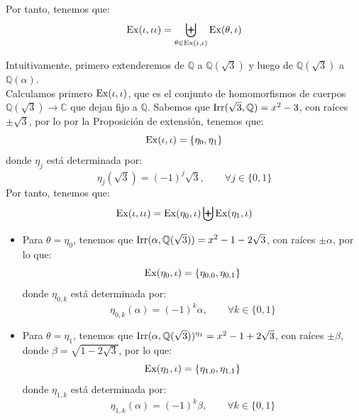 \begin{ejercicio}
\begin{enumerate}
            Por tanto, tenemos que:
            \begin{equation*}
                \operatorname{Ex}(\iota,\iota\iota) = \biguplus_{\theta\in \operatorname{Ex}(\iota,\iota)} \operatorname{Ex}(\theta,\iota)
            \end{equation*}

            Intuitivamente, primero extenderemos de $\mathbb{Q}$ a $\mathbb{Q}(\sqrt{3})$ y luego de $\mathbb{Q}(\sqrt{3})$ a $\mathbb{Q}(\alpha)$.\\


            Calculamos primero $\operatorname{Ex}(\iota,\iota)$, que es el conjunto de homomorfismos de cuerpos $\mathbb{Q}(\sqrt{3})\to \mathbb{C}$ que dejan fijo a $\mathbb{Q}$. Sabemos que $\operatorname{Irr}(\sqrt{3},\mathbb{Q}) = x^2-3$, con raíces $\pm \sqrt{3}$, por lo por la Proposición de extensión, tenemos que:
            \begin{equation*}
                \operatorname{Ex}(\iota,\iota) = \{\eta_0, \eta_1\}
            \end{equation*}
            donde $\eta_j$ está determinada por:
            \begin{equation*}
                \eta_j(\sqrt{3}) = {(-1)}^{j}\sqrt{3}, \qquad \forall j\in \{0,1\}
            \end{equation*}
            Por tanto, tenemos que:
            \begin{equation*}
                \operatorname{Ex}(\iota,\iota\iota) = \operatorname{Ex}(\eta_0,\iota) \biguplus \operatorname{Ex}(\eta_1,\iota)
            \end{equation*}
            \begin{itemize}
                \item Para $\theta = \eta_0$, tenemos que $\operatorname{Irr}(\alpha,\mathbb{Q}(\sqrt{3})) = x^2-1-2\sqrt{3}$, con raíces $\pm \alpha$, por lo que:
                    \begin{equation*}
                        \operatorname{Ex}(\eta_0,\iota) = \{\eta_{0,0},\eta_{0,1}\}
                    \end{equation*}
                    donde $\eta_{0,k}$ está determinada por:
                    \begin{equation*}
                        \eta_{0,k}(\alpha) = {(-1)}^{k}\alpha, \qquad \forall k\in \{0,1\}
                    \end{equation*}
                \item Para $\theta = \eta_1$, tenemos que $\operatorname{Irr}(\alpha,\mathbb{Q}(\sqrt{3}))^{\eta_1} = x^2-1+2\sqrt{3}$, con raíces $\pm \beta$, donde $\beta = \sqrt{1-2\sqrt{3}}$, por lo que:
                    \begin{equation*}
                        \operatorname{Ex}(\eta_1,\iota) = \{\eta_{1,0},\eta_{1,1}\}
                    \end{equation*}
                    donde $\eta_{1,k}$ está determinada por:
                    \begin{equation*}
                        \eta_{1,k}(\alpha) = {(-1)}^{k}\beta, \qquad \forall k\in \{0,1\}
                    \end{equation*}
            \end{itemize}
            

\end{enumerate}
\end{ejercicio}
